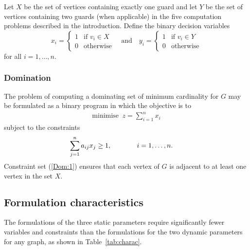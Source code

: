 \documentclass[10pt,a4paper]{article}
\begin{document}
Let $X$ be the set of vertices containing exactly one guard and let $Y$ be the set of vertices containing two guards (when applicable) in the five computation problems described in the introduction. Define the binary decision variables 
\begin{equation}
x_i = \left\{
\begin{array}{rl}
1 & \text{if } v_i \in X\\
0 & \text{otherwise} 
\end{array} \right.
\ \ \    \text{ and } \ \ \ 
y_{i} = \left\{
\begin{array}{rl}
1 &\text{if } v_i \in Y\\
0 & \text{otherwise} 
\end{array} \right.\label{Math:Binary}
\end{equation}
for all $i =1,\ldots,n$.

\subsubsection{Domination}


The problem of computing a dominating set of minimum cardinality for $G$ may be formulated as a binary program in which the objective is to
\begin{align}
\text{minimise }\ z=\sum_{i=1}^n x_i
\end{align}
subject to the constraints
\begin{align}
\sum_{j=1}^n a_{ij}x_j &\geq 1, \hspace{1.14cm}\begin{array}{l}i=1,\ldots,n.\end{array}\label{Dom:1}
 \end{align}
Constraint set (\ref{Dom:1}) ensures that each vertex of $G$ is adjacent to at least one vertex in the set $X$.

\subsection{Formulation characteristics}

The formulations of the three static parameters require significantly fewer variables and constraints than the formulations for the two dynamic parameters for any graph, as shown in Table~\ref{tab:charac}. 
\end{document}
